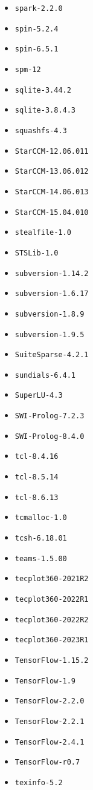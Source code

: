 \begin{multicols}{3}
\begin{itemize}
\item \verb|spark-2.2.0|
\item \verb|spin-5.2.4|
\item \verb|spin-6.5.1|
\item \verb|spm-12|
\item \verb|sqlite-3.44.2|
\item \verb|sqlite-3.8.4.3|
\item \verb|squashfs-4.3|
\item \verb|StarCCM-12.06.011|
\item \verb|StarCCM-13.06.012|
\item \verb|StarCCM-14.06.013|
\item \verb|StarCCM-15.04.010|
\item \verb|stealfile-1.0|
\item \verb|STSLib-1.0|
\item \verb|subversion-1.14.2|
\item \verb|subversion-1.6.17|
\item \verb|subversion-1.8.9|
\item \verb|subversion-1.9.5|
\item \verb|SuiteSparse-4.2.1|
\item \verb|sundials-6.4.1|
\item \verb|SuperLU-4.3|
\item \verb|SWI-Prolog-7.2.3|
\item \verb|SWI-Prolog-8.4.0|
\item \verb|tcl-8.4.16|
\item \verb|tcl-8.5.14|
\item \verb|tcl-8.6.13|
\item \verb|tcmalloc-1.0|
\item \verb|tcsh-6.18.01|
\item \verb|teams-1.5.00|
\item \verb|tecplot360-2021R2|
\item \verb|tecplot360-2022R1|
\item \verb|tecplot360-2022R2|
\item \verb|tecplot360-2023R1|
\item \verb|TensorFlow-1.15.2|
\item \verb|TensorFlow-1.9|
\item \verb|TensorFlow-2.2.0|
\item \verb|TensorFlow-2.2.1|
\item \verb|TensorFlow-2.4.1|
\item \verb|TensorFlow-r0.7|
\item \verb|texinfo-5.2|

\end{itemize}
\end{multicols}
